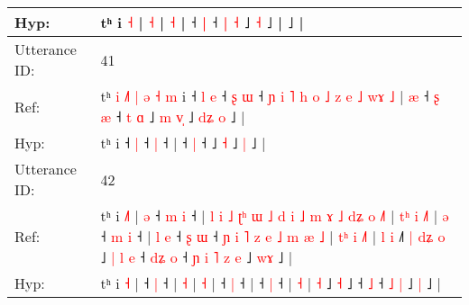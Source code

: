 \documentclass[10pt]{article}
\DeclareRobustCommand{\hl}[1]{{\textcolor{red}{#1}}}
\begin{document}
\begin{longtable}{ll}
 \\
Hyp: & tʰ i \hl{}\hl{˧} |\hl{}\hl{}\hl{}\hl{}\hl{}\hl{}\hl{}\hl{}\hl{}\hl{}\hl{}\hl{}\hl{}\hl{}\hl{}\hl{}\hl{}\hl{}\hl{}\hl{}\hl{}\hl{}\hl{} \hl{˧} |\hl{}\hl{}\hl{}\hl{} \hl{}\hl{˧} |\hl{}\hl{}\hl{}\hl{} ˧\hl{}\hl{}\hl{} \hl{|} ˧\hl{}\hl{}\hl{}\hl{}\hl{}\hl{}\hl{}\hl{}\hl{}\hl{}\hl{}\hl{} \hl{}\hl{}\hl{|} \hl{˧} ˩\hl{}\hl{}\hl{} \hl{˧} ˩ |\hl{}\hl{}\hl{}\hl{}\hl{}\hl{}\hl{}\hl{} ˩ |
 \\
\midrule
Utterance ID: & 41 \\
Ref: & tʰ\hl{ }\hl{i}\hl{ }\hl{˩}\hl{˥}\hl{ }\hl{|}\hl{ }\hl{ə}\hl{ }\hl{˧}\hl{ }\hl{m} i ˧\hl{ }\hl{l} \hl{e} ˧\hl{ }\hl{ʂ} \hl{ɯ} ˧\hl{ }\hl{ɲ}\hl{ }\hl{i}\hl{ }\hl{˥}\hl{ }\hl{h}\hl{ }\hl{o}\hl{ }\hl{˩}\hl{ }\hl{z}\hl{ }\hl{e}\hl{ }\hl{˩}\hl{ }\hl{w}\hl{ɤ}\hl{ }\hl{˩} |\hl{ }\hl{æ} ˧\hl{ }\hl{ʂ} \hl{æ} ˧\hl{ }\hl{t}\hl{ }\hl{ɑ} ˩\hl{ }\hl{m} \hl{v}\hl{̩} ˩\hl{ }\hl{d}\hl{ʑ} \hl{o} ˩ |
 \\
Hyp: & tʰ\hl{}\hl{}\hl{}\hl{}\hl{}\hl{}\hl{}\hl{}\hl{}\hl{}\hl{}\hl{}\hl{} i ˧\hl{}\hl{} \hl{|} ˧\hl{}\hl{} \hl{|} ˧\hl{}\hl{}\hl{}\hl{}\hl{}\hl{}\hl{}\hl{}\hl{}\hl{}\hl{}\hl{}\hl{}\hl{}\hl{}\hl{}\hl{}\hl{}\hl{}\hl{}\hl{}\hl{}\hl{} |\hl{}\hl{} ˧\hl{}\hl{} \hl{|} ˧\hl{}\hl{}\hl{}\hl{} ˩\hl{}\hl{} \hl{}\hl{˧} ˩\hl{}\hl{}\hl{} \hl{|} ˩ |
 \\
\midrule
Utterance ID: & 42 \\
Ref: & tʰ i \hl{˩}\hl{˥} |\hl{ }\hl{ə} ˧\hl{ }\hl{m} \hl{i} ˧ |\hl{ }\hl{l}\hl{ }\hl{i}\hl{ }\hl{˩}\hl{ }\hl{ʈ}\hl{ʰ}\hl{ }\hl{ɯ}\hl{ }\hl{˩}\hl{ }\hl{d}\hl{ }\hl{i}\hl{ }\hl{˩}\hl{ }\hl{m}\hl{ }\hl{ɤ}\hl{ }\hl{˩}\hl{ }\hl{d}\hl{ʑ}\hl{ }\hl{o} \hl{˩}\hl{˥} |\hl{ }\hl{t}\hl{ʰ}\hl{ }\hl{i} \hl{˩}\hl{˥} |\hl{ }\hl{ə} ˧\hl{ }\hl{m} \hl{i} ˧ |\hl{ }\hl{l}\hl{ }\hl{e} ˧\hl{ }\hl{ʂ} \hl{ɯ} ˧\hl{ }\hl{ɲ}\hl{ }\hl{i}\hl{ }\hl{˥}\hl{ }\hl{z}\hl{ }\hl{e}\hl{ }\hl{˩}\hl{ }\hl{m}\hl{ }\hl{æ}\hl{ }\hl{˩} |\hl{ }\hl{t}\hl{ʰ}\hl{ }\hl{i} \hl{˩}\hl{˥} |\hl{ }\hl{l} \hl{i} ˩\hl{˥}\hl{ }\hl{|}\hl{ }\hl{d}\hl{ʑ} \hl{o} ˩\hl{ }\hl{|}\hl{ }\hl{l}\hl{ }\hl{e} ˧\hl{ }\hl{d}\hl{ʑ} \hl{o} ˧\hl{ }\hl{ɲ}\hl{ }\hl{i}\hl{ }\hl{˥} \hl{z} \hl{e} ˩ \hl{w}\hl{ɤ} ˩ |
 \\
Hyp: & tʰ i \hl{}\hl{˧} |\hl{}\hl{} ˧\hl{}\hl{} \hl{|} ˧ |\hl{}\hl{}\hl{}\hl{}\hl{}\hl{}\hl{}\hl{}\hl{}\hl{}\hl{}\hl{}\hl{}\hl{}\hl{}\hl{}\hl{}\hl{}\hl{}\hl{}\hl{}\hl{}\hl{}\hl{}\hl{}\hl{}\hl{}\hl{}\hl{}\hl{} \hl{}\hl{˧} |\hl{}\hl{}\hl{}\hl{}\hl{} \hl{}\hl{˧} |\hl{}\hl{} ˧\hl{}\hl{} \hl{|} ˧ |\hl{}\hl{}\hl{}\hl{} ˧\hl{}\hl{} \hl{|} ˧\hl{}\hl{}\hl{}\hl{}\hl{}\hl{}\hl{}\hl{}\hl{}\hl{}\hl{}\hl{}\hl{}\hl{}\hl{}\hl{}\hl{}\hl{} |\hl{}\hl{}\hl{}\hl{}\hl{} \hl{}\hl{˧} |\hl{}\hl{} \hl{˧} ˩\hl{}\hl{}\hl{}\hl{}\hl{}\hl{} \hl{˧} ˩\hl{}\hl{}\hl{}\hl{}\hl{}\hl{} ˧\hl{}\hl{}\hl{} \hl{˩} ˧\hl{}\hl{}\hl{}\hl{}\hl{}\hl{} \hl{˩} \hl{|} ˩ \hl{}\hl{|} ˩ |

\end{longtable}
\end{document}
